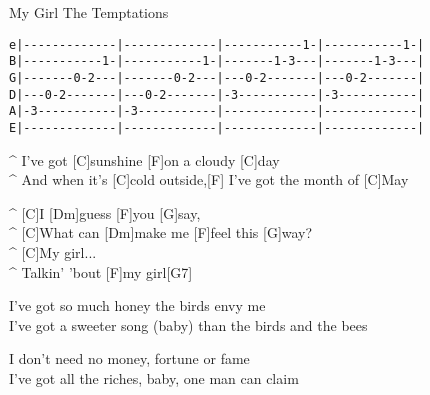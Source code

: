 \begin{song}{My Girl }{The Temptations}

{\scriptsize
\begin{verbatim}
e|-------------|-------------|-----------1-|-----------1-|
B|-----------1-|-----------1-|-------1-3---|-------1-3---|
G|-------0-2---|-------0-2---|---0-2-------|---0-2-------|
D|---0-2-------|---0-2-------|-3-----------|-3-----------|
A|-3-----------|-3-----------|-------------|-------------|
E|-------------|-------------|-------------|-------------|
\end{verbatim}
}

\begin{guitar}
^ I've got [C]sunshine [F]on a cloudy [C]day\\
^ And when it's [C]cold outside,[F] I've got the month of [C]May\\
\end{guitar}

\begin{guitar}
^ [C]I [Dm]guess [F]you [G]say,\\
^ [C]What can [Dm]make me [F]feel this [G]way?\\
^ [C]My girl...\\
^ Talkin' 'bout [F]my girl[G7]\\
\end{guitar}

\begin{guitar}
I've got so much honey the birds envy me\\
I've got a sweeter song (baby) than the birds and the bees\\
\end{guitar}


\begin{guitar}
I don't need no money, fortune or fame\\
I've got all the riches, baby, one man can claim\\
\end{guitar}





\end{song}
